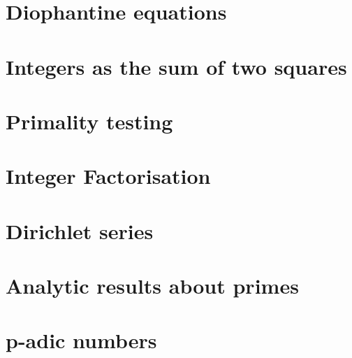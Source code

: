 \section{Diophantine equations}

\section{Integers as the sum of two squares}

\section{Primality testing}

\section{Integer Factorisation}

\section{Dirichlet series}

\section{Analytic results about primes}

\section{p-adic numbers}

